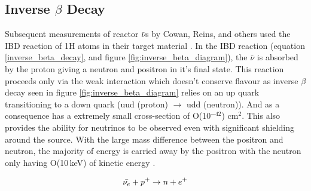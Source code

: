 \subsection{Inverse $\beta$ Decay} \label{subSec:IBD}
Subsequent measurements of reactor $\bar{\nu}$s by Cowan, Reins, and others used
the IBD reaction of 1H atoms in their target material \cite{Cowan1956Confirmation} \cite{sno2001} \cite{superK2001}. In the IBD reaction (equation \ref{inverse_beta_decay}, and figure \ref{fig:inverse_beta_diagram}), the $\bar{\nu}$ is absorbed by the proton giving a neutron and positron in  it's final state. This reaction proceeds only via the weak interaction which doesn't conserve flavour as inverse $\beta$ decay seen in figure \ref{fig:inverse_beta_diagram} relies on an up quark transitioning to a down quark (uud (proton) $\rightarrow$ udd (neutron)). And as a consequence has a extremely small cross-section of O(10$^{-42}$) cm$^2$\cite{Vogel_1999}. This also provides the ability for neutrinos to be observed even with significant shielding around the source. With the large mass difference between the positron and neutron, the majority of energy is carried away by the positron with the neutron only having O(10\,keV) of kinetic energy \cite{Vogel_1999}.

\begin{equation}
    \Bar{\nu_e} + p^+ \rightarrow n + e^+
    \label{inverse_beta_decay}
\end{equation}

